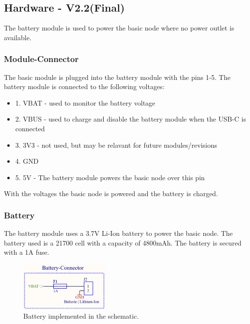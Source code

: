 \subsection{Hardware - V2.2(Final)}

    The battery module is used to power the basic node where no power outlet is available.

    \subsubsection{Module-Connector}
        The basic module is plugged into the battery module with the pins 1-5. 
        The battery module is connected to the following voltages:

        \begin{itemize}
            \item 1. VBAT - used to monitor the battery voltage
            \item 2. VBUS - used to charge and disable the battery module when the USB-C 
            is connected
            \item 3. 3V3 - not used, but may be relavant for future modules/revisions
            \item 4. GND
            \item 5. 5V - The battery module powers the basic node over this pin
        \end{itemize}
        
        With the voltages the basic node is powered and the battery is charged.


    \subsubsection{Battery}

        The battery module uses a 3.7V Li-Ion battery to power the basic node. The battery 
        used is a 21700 cell with a capacity of 4800mAh. The battery is secured with a 1A fuse.
 
        \begin{figure}[H]
            \centering
            \includegraphics[width=0.4\textwidth]{assets/HW/BatteryV2.2_Battery-Terminal.png}
            \caption{Battery implemented in the schematic.}
        \end{figure}


